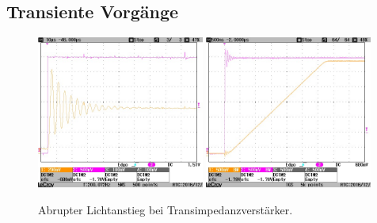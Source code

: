 \subsection{Transiente Vorgänge}
\label{chap:elektronik:transienteVorgaenge}

\begin{figure} \centering
	\includegraphics[width=0.49\textwidth]{img/PicturesPlots/Fotodiodes/LaserSchwach/Steigend/COPY/CONVERT/SCRN0132_Cutted.jpg}
	\includegraphics[width=0.49\textwidth]{img/PicturesPlots/Fotodiodes/LaserMaximal/Steigend/COPY/CONVERT/SCRN0088_Cutted.jpg}
	\caption{Abrupter Lichtanstieg bei Transimpedanzverstärker.}
	\label{fig:laserErkennungSteigend}
\end{figure}

